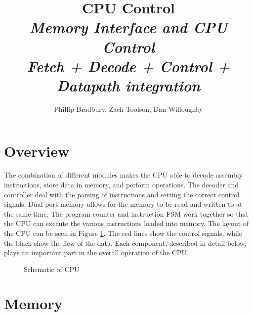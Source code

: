 \documentclass[11pt]{article}
\title{\Huge \textbf{CPU Control} \\ \normalsize \it{Memory Interface and CPU Control \\ Fetch + Decode + Control + Datapath integration}}
\author{Phillip Bradbury, Zach Toolson, Dan Willoughby}
\begin{document}
\maketitle
\clearpage

\tableofcontents
\clearpage

\section{Overview}
The combination of different modules makes the CPU able to decode assembly instructions, store data in memory, and perform operations. The decoder and controller deal with the parsing of instructions and setting the correct control signals. Dual port memory allows for the memory to be read and written to at the same time. The program counter and instruction FSM work together so that the CPU can execute the various instructions loaded into memory. The layout of the CPU can be seen in Figure \ref{fig:schematic}. The red lines show the control signals, while the black show the flow of the data. Each component, described in detail below, plays an important part in the overall operation of the CPU. 
\begin{center}
\begin{figure}
\caption{Schematic of CPU}
\label{fig:schematic}
\end{figure} 
\end{center}
\section{Memory}
\end{document}

